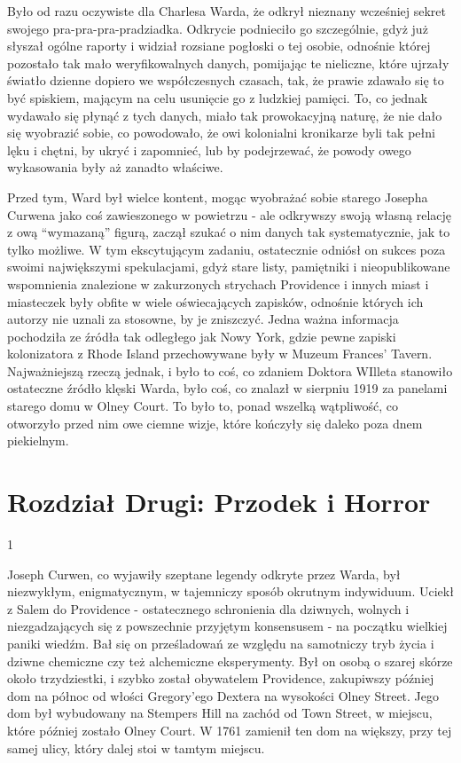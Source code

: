 Było od razu oczywiste dla Charlesa Warda, że odkrył nieznany wcześniej sekret swojego pra-pra-pra-pradziadka. Odkrycie podnieciło go szczególnie, gdyż już słyszał ogólne raporty i widział rozsiane pogłoski o tej osobie, odnośnie której pozostało tak mało weryfikowalnych danych, pomijając te nieliczne, które ujrzały światło dzienne dopiero we współczesnych czasach, tak, że prawie zdawało się to być spiskiem, mającym na celu usunięcie go z ludzkiej pamięci. To, co jednak wydawało się płynąć z tych danych, miało tak prowokacyjną naturę, że nie dało się wyobrazić sobie, co powodowało, że owi kolonialni kronikarze byli tak pełni lęku i chętni, by ukryć i zapomnieć, lub by podejrzewać, że powody owego wykasowania były aż zanadto właściwe. 

Przed tym, Ward był wielce kontent, mogąc wyobrażać sobie starego Josepha Curwena jako coś zawieszonego w powietrzu - ale odkrywszy swoją własną relację z ową ``wymazaną'' figurą, zaczął szukać o nim danych tak systematycznie, jak to tylko możliwe. W tym ekscytującym zadaniu, ostatecznie odniósł on sukces poza swoimi największymi spekulacjami, gdyż stare listy, pamiętniki i nieopublikowane wspomnienia znalezione w zakurzonych strychach Providence i innych miast i miasteczek były obfite w wiele oświecających zapisków, odnośnie których ich autorzy nie uznali za stosowne, by je zniszczyć. Jedna ważna informacja pochodziła ze źródła tak odległego jak Nowy York, gdzie pewne zapiski kolonizatora z Rhode Island przechowywane były w Muzeum Frances' Tavern. Najważniejszą rzeczą jednak, i było to coś, co zdaniem Doktora WIlleta stanowiło ostateczne źródło klęski Warda, było coś, co znalazł w sierpniu 1919 za panelami starego domu w Olney Court. To było to, ponad wszelką wątpliwość, co otworzyło przed nim owe ciemne wizje, które kończyły się daleko poza dnem piekielnym. 


\newpage

\section{Rozdział Drugi: Przodek i Horror}

\begin{center}
1
\end{center}

Joseph Curwen, co wyjawiły szeptane legendy odkryte przez Warda, był niezwykłym, enigmatycznym, w tajemniczy sposób okrutnym indywiduum. Uciekł z Salem do Providence - ostatecznego schronienia dla dziwnych, wolnych i niezgadzających się z powszechnie przyjętym konsensusem - na początku wielkiej paniki wiedźm. Bał się on prześladowań ze względu na samotniczy tryb życia i dziwne chemiczne czy też alchemiczne eksperymenty. Był on osobą o szarej skórze około trzydziestki, i szybko został obywatelem Providence, zakupiwszy później dom na północ od włości Gregory'ego Dextera na wysokości Olney Street. Jego dom był wybudowany na Stempers Hill na zachód od Town Street, w miejscu, które później zostało Olney Court. W 1761 zamienił ten dom na większy, przy tej samej ulicy, który dalej stoi w tamtym miejscu.

